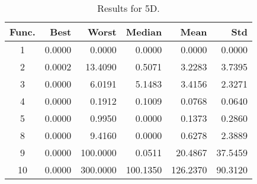 \begin{table}[ht]
\centering
\caption{ Results for 5D. }
\label{tab:5D}
\begin{tabular}{crrrrr}
\hline
{Func.} & Best & Worst & Median & Mean & Std \\
\hline
1 & 0.0000 & 0.0000 & 0.0000 & 0.0000 & 0.0000 \\
2 & 0.0002 & 13.4090 & 0.5071 & 3.2283 & 3.7395 \\
3 & 0.0000 & 6.0191 & 5.1483 & 3.4156 & 2.3271 \\
4 & 0.0000 & 0.1912 & 0.1009 & 0.0768 & 0.0640 \\
5 & 0.0000 & 0.9950 & 0.0000 & 0.1373 & 0.2860 \\
8 & 0.0000 & 9.4160 & 0.0000 & 0.6278 & 2.3889 \\
9 & 0.0000 & 100.0000 & 0.0511 & 20.4867 & 37.5459 \\
10 & 0.0000 & 300.0000 & 100.1350 & 126.2370 & 90.3120 \\
\hline
\end{tabular}
\end{table}
